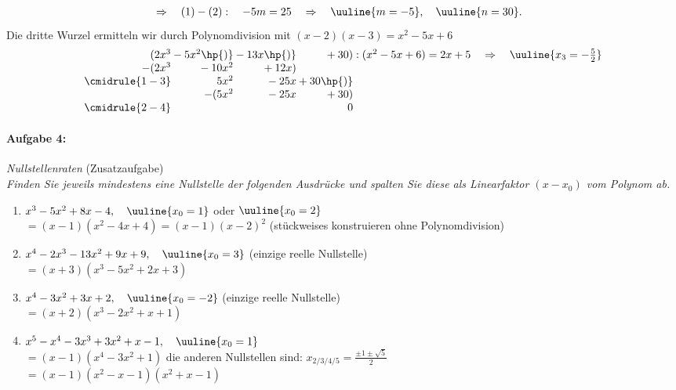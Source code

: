 \begin{enumerate}[label=(\alph*)]
\begin{align}
        & \Rightarrow \quad (1)-(2): \quad -5m = 25 \quad \Rightarrow \quad \uuline{m= -5}, \quad \uuline{n=30}.
    \end{align}
    Die dritte Wurzel ermitteln wir durch Polynomdivision mit $(x-2)(x-3) = x^2 - 5x+6$
    \begin{align}
        \begin{array}{r@{} r@{} r@{} r@{} r}
            (2x^3 &{}-5x^2\hp{)}&{}-13x\hp{)}&{}+30) &\;:(x^2-5x+6) = 2x+5 \quad \Rightarrow  \quad \uuline{x_3 = -\frac{5}{2}}\\
          -(2x^3 &{}-10x^2&{}+12x) \\ 
          \cmidrule{1-3}
                & 5x^2 &{} -25x &{}+30\hp{)}\\
                &-(5x^2&{} -25x&{}+30)\\
          \cmidrule{2-4} 
                & & & 0
        \end{array}\\
    \end{align}
\end{enumerate}

\newpage
\paragraph{Aufgabe 4: } \emph{Nullstellenraten} \hfill (Zusatzaufgabe)\\[0.2cm]
\emph{Finden Sie jeweils mindestens eine Nullstelle der folgenden Ausdrücke und spalten Sie diese als Linearfaktor $(x-x_0)$ vom Polynom ab.}
    \begin{enumerate}[label=(\alph*), labelindent=1em,labelsep=0.5cm]
        \item $x^3-5x^2+8x-4, \quad \uuline{x_0=1}$ oder $\uuline{x_0=2}$ \\
        $= (x-1)(x^2-4x+4) = (x-1)(x-2)^2$ \quad (stückweises konstruieren ohne Polynomdivision)
        \item $x^4-2x^3-13x^2+9x+9, \quad \uuline{x_0=3}$ \hfill(einzige reelle Nullstelle)\\
        $=(x+3)(x^3-5x^2+2x+3)$
        \item $x^4-3x^2+3x+2, \quad \uuline{x_0=-2}$ \hfill(einzige reelle Nullstelle) \\
        $=(x+2)(x^3-2x^2+x+1)$
        \item $x^5-x^4-3x^3+3x^2+x-1, \quad \uuline{x_0 = 1}$\\[-3mm]
        $=(x-1)(x^4-3x^2+1)$ \hfill die anderen Nullstellen sind: $x_{2/3/4/5} = \frac{\pm 1 \pm \sqrt{5}}{2}$\\
        $= (x-1)(x^2-x-1)(x^2+x-1)$
    \end{enumerate}
%
